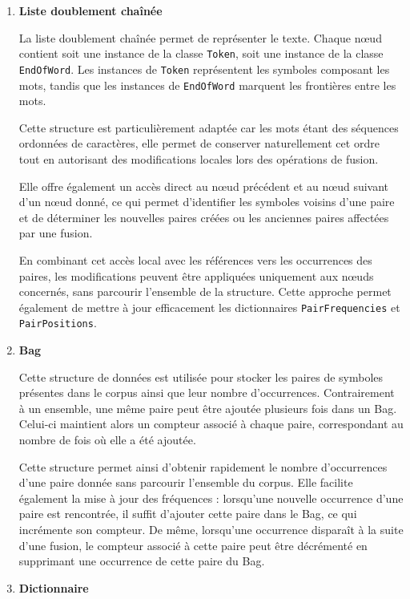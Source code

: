 \documentclass[12pt,a4paper]{report}
\begin{document}
	\begin{enumerate}
		\item \textbf{Liste doublement chaînée}
		
		La liste doublement chaînée permet de représenter le texte. Chaque nœud contient soit une instance de la classe \texttt{Token}, soit une instance de la classe \texttt{EndOfWord}. Les instances de \texttt{Token} représentent les symboles composant les mots, tandis que les instances de \texttt{EndOfWord} marquent les frontières entre les mots.
		
		Cette structure est particulièrement adaptée car les mots étant des séquences ordonnées de caractères, elle permet de conserver naturellement cet ordre tout en autorisant des modifications locales lors des opérations de fusion.
		
		Elle offre également un accès direct au nœud précédent et au nœud suivant d’un nœud donné, ce qui permet d’identifier les symboles voisins d’une paire et de déterminer les nouvelles paires créées ou les anciennes paires affectées par une fusion.
		
		En combinant cet accès local avec les références vers les occurrences des paires, les modifications peuvent être appliquées uniquement aux nœuds concernés, sans parcourir l’ensemble de la structure. Cette approche permet également de mettre à jour efficacement les dictionnaires \texttt{PairFrequencies} et \texttt{PairPositions}.
		
		\item \textbf{Bag}
		
		Cette structure de données est utilisée pour stocker les paires de symboles présentes dans le corpus ainsi que leur nombre d'occurrences. Contrairement à un ensemble, une même paire peut être ajoutée plusieurs fois dans un Bag. Celui-ci maintient alors un compteur associé à chaque paire, correspondant au nombre de fois où elle a été ajoutée.
		
		Cette structure permet ainsi d'obtenir rapidement le nombre d'occurrences d'une paire donnée sans parcourir l'ensemble du corpus. Elle facilite également la mise à jour des fréquences : lorsqu'une nouvelle occurrence d'une paire est rencontrée, il suffit d'ajouter cette paire dans le Bag, ce qui incrémente son compteur. De même, lorsqu'une occurrence disparaît à la suite d'une fusion, le compteur associé à cette paire peut être décrémenté en supprimant une occurrence de cette paire du Bag.
		
		\item \textbf{Dictionnaire}
		

\end{enumerate}
\end{document}
